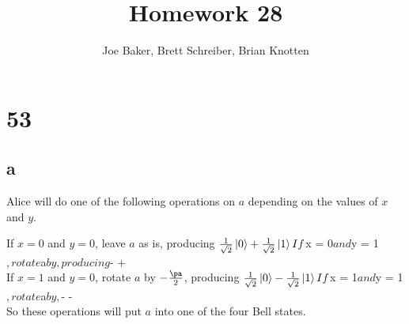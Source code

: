 \documentclass[letterpaper,notitlepage,twoside]{article}
\begin{document}
\title{Homework 28}
\author{Joe Baker, Brett Schreiber, Brian Knotten}
\maketitle

\section*{53}
\subsection*{a}
Alice will do one of the following operations on $a$ depending on the values of $x$ and $y$.

If $x = 0$ and $y = 0$, leave $a$ as is, producing $\frac{1}{\sqrt 2} \ket{0} + \frac{1}{\sqrt 2} \ket{1} \\
If $x = 0$ and $y = 1$, rotate $a$ by $$, producing $-  +   \\
If $x = 1$ and $y = 0$, rotate $a$ by $-\frac{\pa}{2}$, producing $\frac{1}{\sqrt 2} \ket{0} - \frac{1}{\sqrt 2} \ket{1}  \\
If $x = 1$ and $y = 1$, rotate $a$ by $$, $-  -    \\

So these operations will put $a$ into one of the four Bell states.
\end{document}
